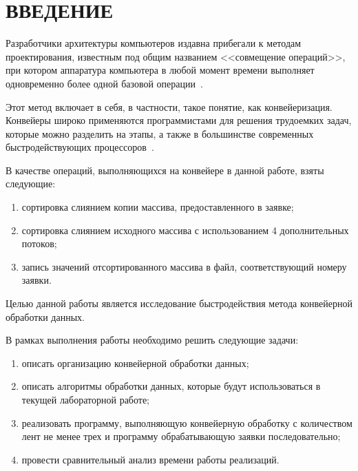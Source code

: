 \chapter*{\hfill{\centering  ВВЕДЕНИЕ}\hfill}


Разработчики архитектуры компьютеров издавна прибегали к методам проектирования, известным под общим названием <<совмещение операций>>, при котором аппаратура компьютера в любой момент времени выполняет одновременно более одной базовой операции~\cite{conveyor}.

Этот метод включает в себя, в частности, такое понятие, как конвейеризация.
Конвейеры широко применяются программистами для решения трудоемких задач, которые можно разделить на этапы, а также в большинстве современных быстродействующих процессоров~\cite{conveyor}.

В качестве операций, выполняющихся на конвейере в данной работе, взяты следующие:
\begin{enumerate}
	\item сортировка слиянием копии массива, предоставленного в заявке;
	\item сортировка слиянием исходного массива с использованием 4 дополнительных потоков;
	\item запись значений отсортированного массива в файл, соответствующий номеру заявки.
\end{enumerate}

Целью данной работы является исследование быстродействия метода конвейерной обработки данных.

В рамках выполнения работы необходимо решить следующие задачи: 
\begin{enumerate}
	\item описать организацию конвейерной обработки данных;
	\item описать алгоритмы обработки данных, которые будут использоваться в текущей лабораторной работе;
	\item реализовать программу, выполняющую конвейерную обработку с количеством лент не менее трех  и программу обрабатывающую заявки последовательно;
	\item провести сравнительный анализ времени работы реализаций.
\end{enumerate}



